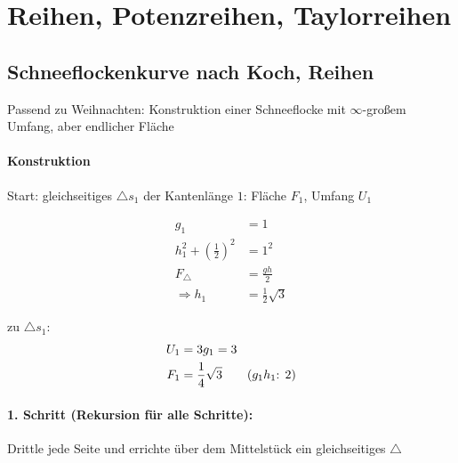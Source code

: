 \chapter{Reihen, Potenzreihen, Taylorreihen}

\section{Schneeflockenkurve nach Koch, Reihen}

Passend zu Weihnachten: Konstruktion einer Schneeflocke mit $\infty$-großem Umfang, aber endlicher Fläche

\subsubsection*{Konstruktion}
Start: gleichseitiges $\triangle s_1$ der Kantenlänge $1$: Fläche $F_1$, Umfang $U_1$

\begin{center}
\end{center}

\begin{align*}
    g_1 &= 1 \\
    h_1^2 + \left(\frac{1}{2}\right)^2 &= 1^2 \\
    F_{\triangle} &= \frac{g h}{2} \\
    \Rightarrow h_1 &= \frac{1}{2} \sqrt{3}
\end{align*}

zu $\triangle s_1$:
\begin{align*}
    U_1 &= 3 g_1 = 3 \\
    F_1 &= \frac{1}{4} \sqrt{3} \hspace{20px} \text{($g_1 h_1$: 2)}
\end{align*}

\subsubsection*{1. Schritt (Rekursion für alle Schritte):}

Drittle jede Seite und errichte über dem Mittelstück ein gleichseitiges $\triangle$

